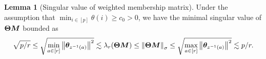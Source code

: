\documentclass[lettersize,onecolumn,journal]{IEEEtran}
\theoremstyle{definition}
\newtheorem{lem}{Lemma}
\theoremstyle{definition}
\newcommand{\ang}[1]{\left\langle#1\right\rangle}
\def\fixme#1#2{\textbf{\color{red}[FIXME (#1): #2]}}
\begin{document}


\begin{lem}[Singular value of weighted membership matrix]\label{lem:singular_thetam} Under the assumption that $\min_{i \in [p]} \theta(i) \geq c_0 >0$, we have the minimal singular value of $\boldsymbol{\Theta} \bm M$ bounded as 
\begin{equation}\label{eq:membership2}
     \sqrt{p/r} \leq \sqrt{ \min_{a \in [r]}\onorm{ \mtheta_{ z^{-1}(a)} }^2 }  \lesssim \lambda_{r}(\mTheta \mM) \leq \onorm{\mTheta \mM}_{\sigma} \leq\sqrt{ \max_{a \in [r]}\onorm{ \mtheta_{ z^{-1}(a)} }^2 } \lesssim  p /r .
\end{equation}
\end{lem}
\end{document}
